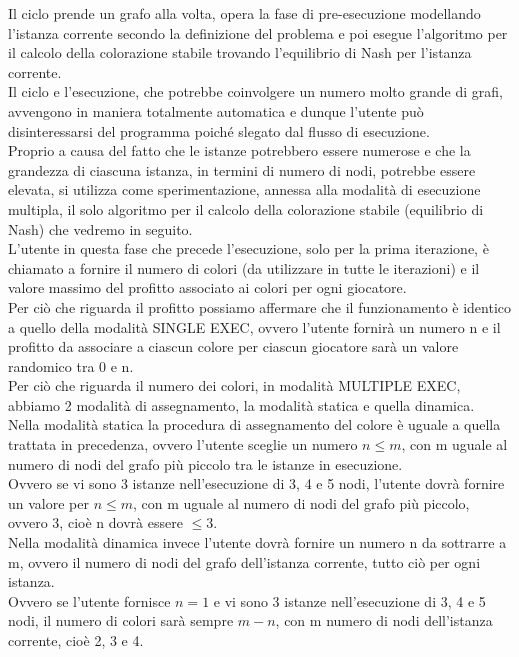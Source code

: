 Il ciclo prende un grafo alla volta, opera la fase di pre-esecuzione modellando l'istanza corrente secondo la definizione del problema e poi esegue l'algoritmo per il calcolo della colorazione stabile trovando l'equilibrio di Nash per l'istanza corrente.\\
Il ciclo e l'esecuzione, che potrebbe coinvolgere un numero molto grande di grafi, avvengono in maniera totalmente automatica e dunque l'utente può disinteressarsi del programma poiché slegato dal flusso di esecuzione.\\

Proprio a causa del fatto che le istanze potrebbero essere numerose e che la grandezza di ciascuna istanza, in termini di numero di nodi, potrebbe essere elevata, si utilizza come sperimentazione, annessa alla modalità di esecuzione multipla, il solo algoritmo per il calcolo della colorazione stabile (equilibrio di Nash) che vedremo in seguito.\\

L'utente in questa fase che precede l'esecuzione, solo per la prima iterazione, è chiamato a fornire il numero di colori (da utilizzare in tutte le iterazioni) e il valore massimo del profitto associato ai colori per ogni giocatore.\\

Per ciò che riguarda il profitto possiamo affermare che il funzionamento è identico a quello della modalità SINGLE EXEC, ovvero l'utente fornirà un numero n e il profitto da associare a ciascun colore per ciascun giocatore sarà un valore randomico tra 0 e n.\\

Per ciò che riguarda il numero dei colori, in modalità MULTIPLE EXEC, abbiamo 2 modalità di assegnamento, la modalità statica e quella dinamica.\\
Nella modalità statica la procedura di assegnamento del colore è uguale a quella trattata in precedenza, ovvero l'utente sceglie un numero \(n \leq m\), con m uguale al numero di nodi del grafo più piccolo tra le istanze in esecuzione.\\
Ovvero se vi sono 3 istanze nell'esecuzione di 3, 4 e 5 nodi, l'utente dovrà fornire un valore per \(n \leq m\), con m uguale al numero di nodi del grafo più piccolo, ovvero 3, cioè n dovrà essere \(\leq 3\).\\

Nella modalità dinamica invece l'utente dovrà fornire un numero n da sottrarre a m, ovvero il numero di nodi del grafo dell'istanza corrente, tutto ciò per ogni istanza.\\
Ovvero se l'utente fornisce \(n = 1\) e vi sono 3 istanze nell'esecuzione di 3, 4 e 5 nodi, il numero di colori sarà sempre \(m -n\), con m numero di nodi dell'istanza corrente, cioè 2, 3 e 4.\\

